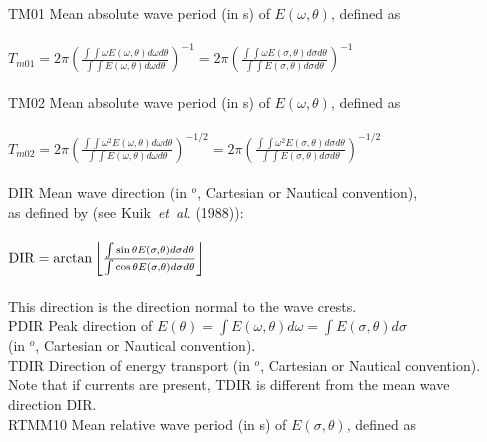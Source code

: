 \documentclass[12pt]{book}
\begin{document}
\begin{tabbing}
                        \-\\
TM01                 \> Mean absolute wave period (in s) of $E(\omega,\theta)$, defined as\+\\
                        \\
$T_{m01} = 2\pi \left(\frac{\int \int \omega E(\omega, \theta) d\omega d\theta}{\int \int E(\omega, \theta) d\omega d\theta} \right)^{-1} = 2\pi \left(\frac{\int \int \omega E(\sigma, \theta) d\sigma d\theta}{\int \int E(\sigma, \theta) d\sigma d\theta} \right)^{-1}$ \\
                        \-\\
TM02                 \> Mean absolute wave period (in s) of $E(\omega,\theta)$, defined as\+\\
                        \\
$T_{m02} = 2\pi \left(\frac{\int \int \omega^2 E(\omega, \theta) d\omega d\theta}{\int \int E(\omega, \theta) d\omega d\theta} \right)^{-1/2} = 2\pi \left(\frac{\int \int \omega^2 E(\sigma, \theta) d\sigma d\theta}{\int \int E(\sigma, \theta) d\sigma d\theta} \right)^{-1/2}$ \\
                        \-\\
DIR                  \> Mean wave direction (in $^o$, Cartesian or Nautical convention),\+\\
                        as defined by (see Kuik~{\it et~al}. (1988)):\\
                        \\
${\rm DIR} = \arctan \left\lfloor \frac{\int \sin \theta E(\sigma, \theta) d\sigma d\theta}{\int \cos \theta E(\sigma, \theta) d\sigma d\theta} \right\rfloor$ \\
                        \\
                        This direction is the direction normal to the wave crests.\-\\
PDIR                 \> Peak direction of $E(\theta) = \int E(\omega,\theta)d\omega = \int E(\sigma,\theta)d\sigma$\+\\
                        (in $^o$, Cartesian or Nautical convention).\-\\
TDIR                 \> Direction of energy transport (in $^o$, Cartesian or Nautical convention).\+\\
                        Note that if currents are present, TDIR is different from the mean wave\\
                        direction DIR.\-\\
RTMM10               \> Mean relative wave period (in s) of $E(\sigma,\theta)$, defined as\+\\

\end{tabbing}
\end{document}
